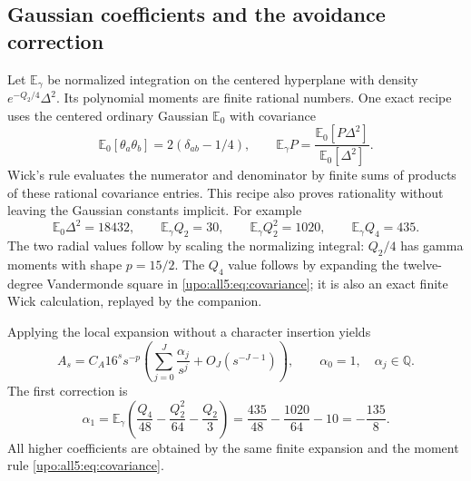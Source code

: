 \documentclass[11pt,letterpaper]{article}
\theoremstyle{remark}\newtheorem{remark}[theorem]{Remark}
\numberwithin{equation}{section}
\newcommand{\E}{\mathbb E}
\begin{document}
\subsection{Gaussian coefficients and the avoidance correction}
Let $\E_\gamma$ be normalized integration on the centered hyperplane
with density $e^{-Q_2/4}\Delta^2$. Its polynomial moments are finite
rational numbers. One exact recipe uses the centered ordinary
Gaussian $\E_0$ with covariance
\begin{equation}\label{upo:all5:eq:covariance}
 \E_0[\theta_a\theta_b]=2(\delta_{ab}-1/4),\qquad
 \E_\gamma P=\frac{\E_0[P\Delta^2]}{\E_0[\Delta^2]}.
\end{equation}
Wick's rule evaluates the numerator and denominator by finite sums
of products of these rational covariance entries. This recipe also
proves rationality without leaving the Gaussian constants implicit.
For example
\begin{equation}\label{upo:all5:eq:moments}
 \E_0\Delta^2=18432,\qquad
 \E_\gamma Q_2=30,\qquad
 \E_\gamma Q_2^2=1020,\qquad
 \E_\gamma Q_4=435.
\end{equation}
The two radial values follow by scaling the normalizing integral:
$Q_2/4$ has gamma moments with shape $p=15/2$.
The $Q_4$ value follows by expanding the twelve-degree Vandermonde
square in \eqref{upo:all5:eq:covariance}; it is also an exact finite Wick
calculation, replayed by the companion.

Applying the local expansion without a character insertion yields
\begin{equation}\label{upo:all5:eq:avoid-all}
 A_s=C_A16^s s^{-p}
 \left(\sum_{j=0}^J\frac{\alpha_j}{s^j}
                        +O_J(s^{-J-1})\right),\qquad
 \alpha_0=1,\quad \alpha_j\in\mathbb Q.
\end{equation}
The first correction is
\begin{equation}\label{upo:all5:eq:alpha1}
 \alpha_1=\E_\gamma\left(\frac{Q_4}{48}
                  -\frac{Q_2^2}{64}-\frac{Q_2}{3}\right)
          =\frac{435}{48}-\frac{1020}{64}-10=-\frac{135}{8}.
\end{equation}
All higher coefficients are obtained by the same finite expansion
and the moment rule \eqref{upo:all5:eq:covariance}.
\end{document}
